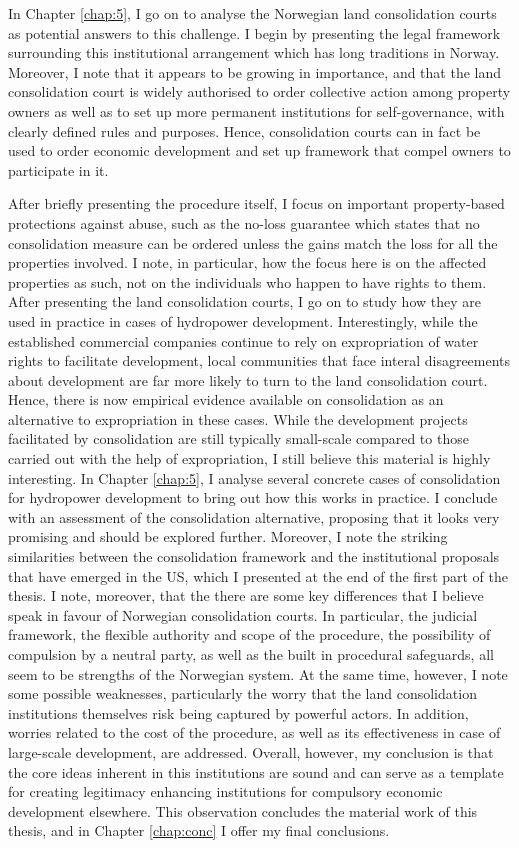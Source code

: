 {In Chapter \ref{chap:5}, I go on to analyse the Norwegian land consolidation courts as potential answers to this challenge. I begin by presenting the legal framework surrounding this institutional arrangement which has long traditions in Norway. Moreover, I note that it appears to be growing in importance, and that the land consolidation court is widely authorised to order collective action among property owners as well as to set up more permanent institutions for self-governance, with clearly defined rules and purposes. Hence, consolidation courts can in fact be used to order economic development and set up framework that compel owners to participate in it. 

After briefly presenting the procedure itself, I focus on important property-based protections against abuse, such as the no-loss guarantee which states that no consolidation measure can be ordered unless the gains match the loss for all the properties involved. I note, in particular, how the focus here is on the affected properties as such, not on the individuals who happen to have rights to them. After presenting the land consolidation courts, I go on to study how they are used in practice in cases of hydropower development. Interestingly, while the established commercial companies continue to rely on expropriation of water rights to facilitate development, local communities that face interal disagreements about development are far more likely to turn to the land consolidation court. Hence, there is now empirical evidence available on consolidation as an alternative to expropriation in these cases. While the development projects facilitated by consolidation are still typically small-scale compared to those carried out with the help of expropriation, I still believe this material is highly interesting. In Chapter \ref{chap:5}, I analyse several concrete cases of consolidation for hydropower development to bring out how this works in practice. I conclude with an assessment of the consolidation alternative, proposing that it looks very promising and should be explored further. Moreover, I note the striking similarities between the consolidation framework and the institutional proposals that have emerged in the US, which I presented at the end of the first part of the thesis. I note, moreover, that the there are some key differences that I believe speak in favour of Norwegian consolidation courts. In particular, the judicial framework, the flexible authority and scope of the procedure, the possibility of compulsion by a neutral party, as well as the built in procedural safeguards, all seem to be strengths of the Norwegian system. At the same time, however, I note some possible weaknesses, particularly the worry that the land consolidation institutions themselves risk being captured by powerful actors. In addition, worries related to the cost of the procedure, as well as its effectiveness in case of large-scale development, are addressed. Overall, however, my conclusion is that the core ideas inherent in this institutions are sound and can serve as a template for creating legitimacy enhancing institutions for compulsory economic development elsewhere. This observation concludes the material work of this thesis, and in Chapter \ref{chap:conc} I offer my final conclusions.

}
